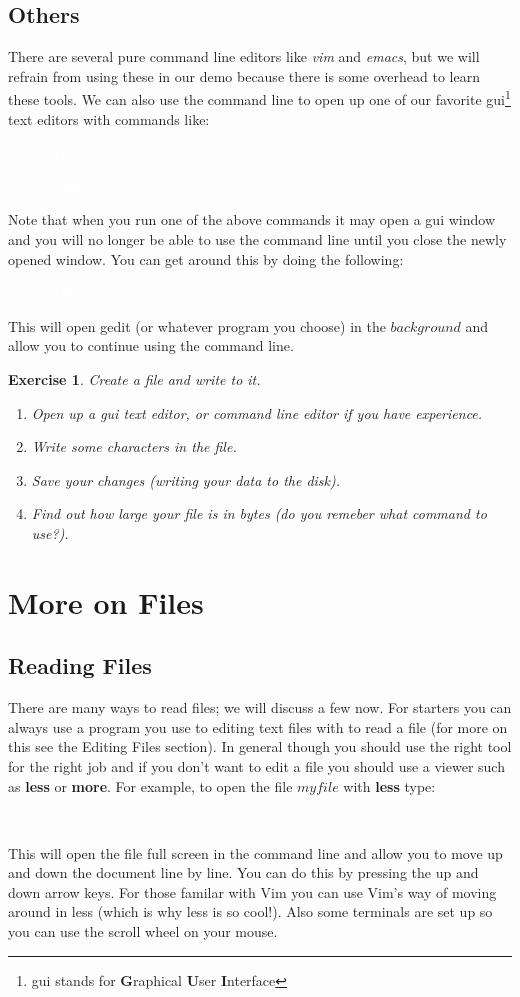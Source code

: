 \documentclass[oneside]{book}
\newcommand{\commandline}[1]{\begin{center} \colorbox{Dark}{\textcolor{white}{#1}} \end{center}}
\newtheorem{ex}{Exercise}[chapter]
\begin{document}
\subsection{Others}
There are several pure command line editors like \textit{vim} and \textit{emacs}, but we will refrain from using these in our demo because there is some overhead to learn these tools. We can also use the command line to open up one of our favorite gui\footnote{gui stands for \textbf{G}raphical \textbf{U}ser \textbf{I}nterface} text editors with commands like: 
\commandline{gedit myfile}
\commandline{atom myfile}
Note that when you run one of the above commands it may open a gui window and you will no longer be able to use the command line until you close the newly opened window. You can get around this by doing the following:
\commandline{gedit myfile \&}
This will open gedit (or whatever program you choose) in the $background$ and allow you to continue using the command line. \\

\begin{ex} Create a file and write to it.
    \begin{enumerate}
        \item Open up a gui text editor, or command line editor if you have experience.
        \item Write some characters in the file.
        \item Save your changes (writing your data to the disk).
        \item Find out how large your file is in bytes (do you remeber what command to use?).
    \end{enumerate}
    
\end{ex}

\section{More on Files}

\subsection{Reading Files}
	There are many ways to read files; we will discuss a few now. For starters you can always use a program you use to editing text files with to read a file (for more on this see the Editing Files section). In general though you should use the right tool for the right job and if you don't want to edit a file you should use a viewer such as \textbf{less} or \textbf{more}.
	For example, to open the file $myfile$ with \textbf{less} type:
\commandline{less myfile}
This will open the file full screen in the command line and allow you to move up and down the document line by line. You can do this by pressing the up and down arrow keys. For those familar with Vim you can use Vim's way of moving around in less (which is why less is so cool!). Also some terminals are set up so you can use the scroll wheel on your mouse. 
\end{document}
